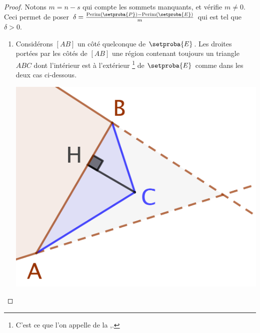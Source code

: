 \begin{proof}
	\newpage %

	Notons $m = n - s$ qui compte les sommets manquants, et vérifie $m \neq 0$. 
	Ceci permet de poser
	$\delta = \frac{\perim{\setproba{P}} - \perim{\setproba{E}}}{m}$ qui est tel que $\delta > 0$.
	\begin{enumerate}
		\item \label{add-vertex-start}
		Considérons $[AB]$ un côté quelconque de $\setproba{E}$.
		Les droites portées par les côtés  de $[AB]$  une région contenant toujours un triangle $ABC$ dont l'intérieur est à l'extérieur
		\footnote{
			C'est ce que l'on appelle de la ,.
		}
		de $\setproba{E}$ comme dans les deux cas ci-dessous.
		\begin{multicols}{2}
			\centering

			\includegraphics[scale=.35]{content/polygon/sol-must-be/add-vertex-1.png}


\end{multicols}
\end{enumerate}
\end{proof}

